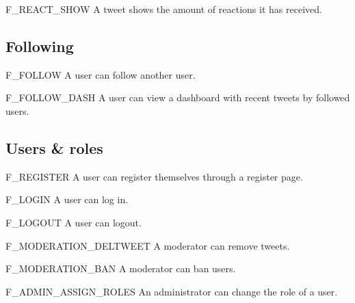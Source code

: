 \begin{tereqdef}{F_REACT_SHOW}
    A tweet shows the amount of reactions it has received.
\end{tereqdef}

\subsection{Following}

\begin{tereqdef}{F_FOLLOW}
    A user can follow another user.
\end{tereqdef}

\begin{tereqdef}{F_FOLLOW_DASH}
    A user can view a dashboard with recent tweets by followed users.
\end{tereqdef}

\subsection{Users \& roles}

\begin{tereqdef}{F_REGISTER}
    A user can register themselves through a register page.
\end{tereqdef}

\begin{tereqdef}{F_LOGIN}
    A user can log in.
\end{tereqdef}

\begin{tereqdef}{F_LOGOUT}
    A user can logout.
\end{tereqdef}

\begin{tereqdef}{F_MODERATION_DELTWEET}
    A moderator can remove tweets.
\end{tereqdef}

\begin{tereqdef}{F_MODERATION_BAN}
    A moderator can ban users.
\end{tereqdef}

\begin{tereqdef}{F_ADMIN_ASSIGN_ROLES}
    An administrator can change the role of a user.
\end{tereqdef}

\section{}

